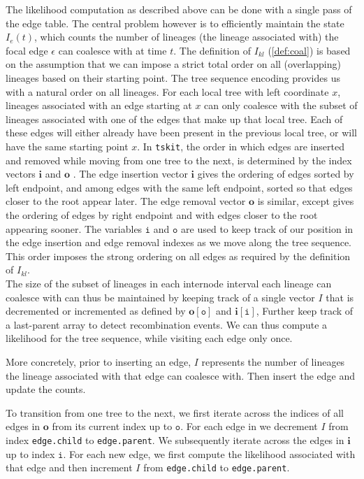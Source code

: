 \documentclass{article}
\begin{document}
The likelihood computation as described above can be done with a single pass 
of the edge table.
The central problem however is to efficiently maintain the state $I_e(t)$, which counts 
the number of lineages (the lineage associated with) the focal edge $\epsilon$ can coalesce 
with at time $t$. 
The definition of $I_{kl}$ (\ref{def:coal}) is based on the assumption 
that we can impose a strict total order on all (overlapping) lineages based on their 
starting point. The tree sequence encoding provides us with a natural order on all lineages.  
For each local tree with left coordinate $x$, lineages associated with an edge 
starting at $x$ can only coalesce with the subset of lineages associated with one of the
edges that make up that local tree. Each of these edges will either already have 
been present in the previous local tree, or will have the same starting point $x$.
In \texttt{tskit}, the order in which edges are inserted and removed 
while moving from one tree to the next, is determined by the index 
vectors $\textbf{i}$ and $\textbf{o}$ \citep{kelleher_efficient_2016}.
The edge insertion vector $\textbf{i}$ gives the ordering of edges sorted by left 
endpoint, and among edges with the same left endpoint, sorted so that edges closer 
to the root appear later. The edge removal vector $\textbf{o}$ is similar, 
except gives the ordering of edges by right endpoint and with edges closer to the 
root appearing sooner. The variables $\texttt{i}$ and 
$\texttt{o}$ are used to keep track of our position in the edge insertion and edge removal 
indexes as we move along the tree sequence. This order imposes the 
strong ordering on all edges as required by the definition of $I_{kl}$.\\

The size of the subset of lineages in each internode interval each lineage 
can coalesce with can thus be maintained by keeping track of a single vector $I$ 
that is decremented or incremented as defined by
$\textbf{o}[\texttt{o}]$ and $\textbf{i}[\texttt{i}]$, 
Further keep track of a last-parent array to detect recombination events.
We can thus compute a likelihood for the tree sequence, while visiting each edge only once.

More concretely, prior to inserting an edge, $I$ represents the number of lineages 
the lineage associated with 
that edge can coalesce with. Then insert the edge and update the counts.

To transition from one tree to the next, we first iterate across the indices of all edges 
in $\textbf{o}$ from its current index up to $\texttt{o}$. For each edge in we decrement $I$ 
from index \texttt{edge.child} to \texttt{edge.parent}. We subsequently iterate across the 
edges in $\textbf{i}$ up to index $\texttt{i}$. For each new edge, we first compute the likelihood 
associated with that edge and then 
increment $I$ from \texttt{edge.child} to \texttt{edge.parent}.\\
\end{document}
